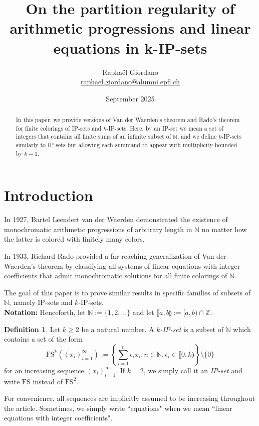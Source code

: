 \documentclass{article}
\title{On the partition regularity of arithmetic progressions and linear equations in k-IP-sets}
\author{Raphaël Giordano \\ \href{raphael.giordano@alumni.epfl.ch}{raphael.giordano@alumni.epfl.ch}}
\date{September 2025}
\theoremstyle{definition}
\newtheorem{definition}{Definition}[section]
\theoremstyle{plain}
\theoremstyle{remark}
\newcommand{\N}{\ensuremath{\mathbb{N}}}
\newcommand{\Z}{\ensuremath{\mathbb{Z}}}
\newcommand{\FS}[2][]{\ensuremath{\mathrm{FS}^{#1}\left(#2\right)}}
\newcommand{\seq}[2]{\ensuremath{\left ( {#1}_{#2}\right )_{#2 = 1}^\infty }}
\begin{document}
\maketitle

\begin{abstract}
    In this paper, we provide versions of Van der Waerden's theorem and Rado's theorem for finite colorings of IP-sets and $k$-IP-sets. Here, by an IP-set we mean a set of integers that contains all finite sums of an infinite subset of $\N$, and we define $k$-IP-sets similarly to IP-sets but allowing each summand to appear with multiplicity bounded by $k-1$. 
\end{abstract}


\tableofcontents

\section{Introduction}
    In 1927, Bartel Leendert van der Waerden demonstrated the existence of monochromatic arithmetic progressions of arbitrary length in $\N$ no matter how the latter is colored with finitely many colors.
    
   In 1933, Richard Rado provided a far-reaching generalization of Van der Waerden's theorem by classifying all systems of linear equations with integer coefficients that admit monochromatic solutions for all finite colorings of $\N$.
    
    The goal of this paper is to prove similar results in specific families of subsets of $\N$, namely IP-sets and $k$-IP-sets.\\

    \textbf{Notation:} Henceforth, let $\N := \{1,2,\ldots\}$
    and let $\llbracket a,b \rrparenthesis := [a,b)\cap \Z$.

    \begin{definition}
        Let $k \geq 2$ be a natural number. A \emph{$k$-IP-set} is a subset of $\N$ which contains a set of the form
        $$\FS[k]{\seq{x}{i}} := \left \{\sum_{i=1}^n \epsilon_i x_i : n\in \N, \epsilon_i \in \llbracket 0,k \rrparenthesis\right \}\setminus \{0\}$$
        for an increasing sequence $\seq{x}{i}$. If $k=2$, we simply call it an \emph{IP-set} and write $\mathrm{FS}$ instead of $\mathrm{FS}^2$.
    \end{definition}
    
    For convenience, all sequences are implicitly assumed to be increasing throughout the article. Sometimes, we simply write “equations" when we mean “linear equations with integer coefficients".
\end{document}
